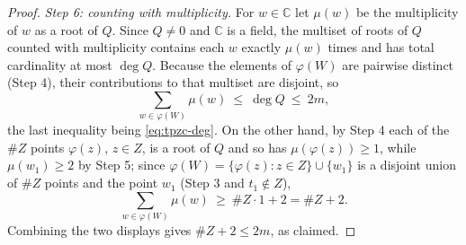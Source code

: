 \begin{proof}
\emph{Step 6: counting with multiplicity.} For $w\in\mathbb{C}$ let $\mu(w)$ be
the multiplicity of $w$ as a root of $Q$. Since $Q\ne0$ and $\mathbb{C}$ is a
field, the multiset of roots of $Q$ counted with multiplicity contains each $w$
exactly $\mu(w)$ times and has total cardinality at most $\deg Q$. Because the
elements of $\varphi(W)$ are pairwise distinct (Step 4), their contributions to
that multiset are disjoint, so
\[
  \sum_{w\in\varphi(W)}\mu(w)\ \le\ \deg Q\ \le\ 2m,
\]
the last inequality being \eqref{eq:tpzc-deg}. On the other hand, by Step 4 each
of the $\#Z$ points $\varphi(z)$, $z\in Z$, is a root of $Q$ and so has
$\mu(\varphi(z))\ge1$, while $\mu(w_1)\ge2$ by Step 5; since
$\varphi(W)=\{\varphi(z):z\in Z\}\cup\{w_1\}$ is a disjoint union of $\#Z$
points and the point $w_1$ (Step 3 and $t_1\notin Z$),
\[
  \sum_{w\in\varphi(W)}\mu(w)\ \ge\ \#Z\cdot 1+2=\#Z+2 .
\]
Combining the two displays gives $\#Z+2\le 2m$, as claimed.
\end{proof}
